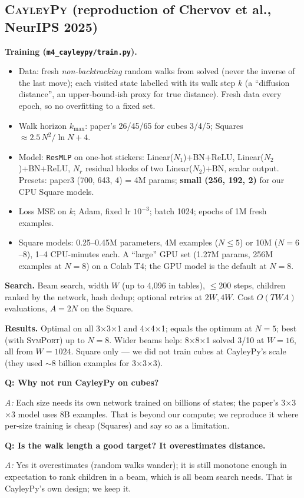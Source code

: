 \documentclass[10.5pt,a4paper]{article}
\newcommand{\Cu}[1]{#1$\times$#1$\times$#1}
\newcommand{\Sq}[1]{#1$\times$#1$\times$1}
\newcommand{\M}[1]{\textsc{#1}}
\newcommand{\Q}[1]{\par\smallskip\textbf{Q: #1}\par}
\newcommand{\A}{\textit{A:} }
\begin{document}
\subsection{\M{CayleyPy} (reproduction of Chervov et al., NeurIPS 2025)}
\textbf{Training (\texttt{m4\_cayleypy/train.py}).}
\begin{itemize}
\item Data: fresh \emph{non-backtracking} random walks from solved (never the inverse of the last move); each visited state labelled
with its walk step $k$ (a ``diffusion distance'', an upper-bound-ish proxy for true distance). Fresh data every epoch, so no
overfitting to a fixed set.
\item Walk horizon $k_{\max}$: paper's 26/45/65 for cubes 3/4/5; Squares $\approx 2.5\,N^2/\ln N+4$.
\item Model: \texttt{ResMLP} on one-hot stickers: Linear($N_1$)+BN+ReLU, Linear($N_2$)+BN+ReLU, $N_r$ residual blocks of two
Linear($N_2$)+BN, scalar output. Presets: paper3 (700, 643, 4) = 4M params; \textbf{small (256, 192, 2)} for our CPU Square models.
\item Loss MSE on $k$; Adam, fixed lr $10^{-3}$; batch 1024; epochs of 1M fresh examples.
\item Square models: 0.25--0.45M parameters, 4M examples ($N\le5$) or 10M ($N=6$--8), 1--4 CPU-minutes each. A ``large'' GPU set
(1.27M params, 256M examples at $N=8$) on a Colab T4; the GPU model is the default at $N=8$.
\end{itemize}
\textbf{Search.} Beam search, width $W$ (up to 4,096 in tables), $\le200$ steps, children ranked by the network, hash dedup; optional
retries at $2W, 4W$. Cost $O(TWA)$ evaluations, $A=2N$ on the Square.

\textbf{Results.} Optimal on all \Sq{3} and \Sq{4}; equals the optimum at $N=5$; best (with \M{SymPort}) up to $N=8$. Wider beams
help: \Sq{8} solved 3/10 at $W=16$, all from $W=1024$. Square only --- we did not train cubes at CayleyPy's scale (they used
$\sim$8 billion examples for \Cu{3}).

\Q{Why not run CayleyPy on cubes?} \A Each size needs its own network trained on billions of states; the paper's \Cu{3} model
uses 8B examples. That is beyond our compute; we reproduce it where per-size training is cheap (Squares) and say so as a
limitation.

\Q{Is the walk length a good target? It overestimates distance.} \A Yes it overestimates (random walks wander); it is still
monotone enough in expectation to rank children in a beam, which is all beam search needs. That is CayleyPy's own design; we keep it.
\end{document}
